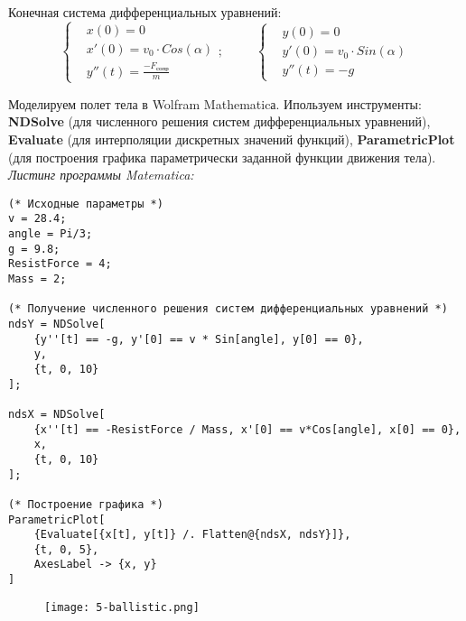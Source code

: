 Конечная система дифференциальных уравнений:
\begin{equation*}
    \left\{
        \begin{aligned}
            &x(0) = 0 \\
            &x'(0) = v_{0} \cdot Cos(\alpha) \\
            &y''(t) = \frac{-F_{\text{сопр}}}{m}
        \end{aligned}
    \right.; \;\;\;\;\;\;\;\;\;
    \left\{
        \begin{aligned}
            &y(0) = 0 \\
            &y'(0) = v_{0} \cdot Sin(\alpha) \\
            &y''(t) = -g
        \end{aligned}
    \right. \end{equation*}

\newpage
Моделируем полет тела в Wolfram Mathematicа. 
Ипользуем инструменты: 
\textbf{NDSolve} (для численного решения систем дифференциальных уравнений), 
\textbf{Evaluate} (для интерполяции дискретных значений функций),
\textbf{ParametricPlot} (для построения графика параметрически заданной функции движения тела).\\[10pt]

\textit{Листинг программы Matematica:}
\begin{lstlisting}
(* Исходные параметры *)
v = 28.4;
angle = Pi/3;
g = 9.8;
ResistForce = 4;
Mass = 2;

(* Получение численного решения систем дифференциальных уравнений *)
ndsY = NDSolve[
    {y''[t] == -g, y'[0] == v * Sin[angle], y[0] == 0}, 
    y, 
    {t, 0, 10}
];
   
ndsX = NDSolve[
    {x''[t] == -ResistForce / Mass, x'[0] == v*Cos[angle], x[0] == 0}, 
    x, 
    {t, 0, 10}
];

(* Построение графика *)
ParametricPlot[
    {Evaluate[{x[t], y[t]} /. Flatten@{ndsX, ndsY}]}, 
    {t, 0, 5},
    AxesLabel -> {x, y}
] 
\end{lstlisting}

\begin{figure}[ht]
\centering
\texttt{[image: 5-ballistic.png]}
\end{figure}
